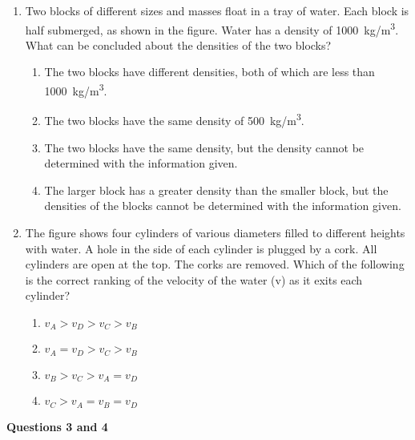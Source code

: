 \documentclass{../../oss-apphys}
\begin{document}
\genheader


\genmultidirections

\gengravity

\raggedcolumns
\begin{multicols}{2}

  \begin{enumerate}[leftmargin=18pt]

  \item Two blocks of different sizes and masses float in a tray of water. Each
    block is half submerged, as shown in the figure. Water has a density of
    \SI{1000}{kg/m^3}. What can be concluded about the densities of the two
    blocks?
    \begin{enumerate}[noitemsep,topsep=0pt,leftmargin=18pt,label=(\Alph*)]
    \item The two blocks have different densities, both of which are less than
      \SI{1000}{kg/m^3}.
    \item The two blocks have the same density of \SI{500}{kg/m^3}.
    \item The two blocks have the same density, but the density cannot be
      determined with the information given.
    \item The larger block has a greater density than the smaller block, but
      the densities of the blocks cannot be determined with the information
      given.
    \end{enumerate}

  \item The figure shows four cylinders of various diameters filled to different
    heights with water. A hole in the side of each cylinder is plugged by a
    cork. All cylinders are open at the top. The corks are removed. Which
    of the following is the correct ranking of the velocity of the water (v)
    as it exits each cylinder?
    \begin{enumerate}[noitemsep,topsep=0pt,leftmargin=18pt,label=(\Alph*)]
    \item $v_A > v_D > v_C > v_B$
    \item $v_A = v_D > v_C > v_B$
    \item $v_B > v_C > v_A = v_D$
    \item $v_C > v_A = v_B = v_D$
    \end{enumerate}
  \end{enumerate}
  
  \textbf{Questions 3 and 4}


\end{multicols}
\end{document}
